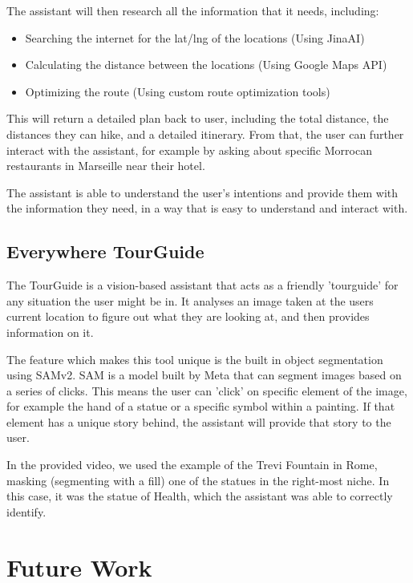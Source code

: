 \documentclass{article}
\begin{document}
The assistant will then research all the information that it needs, including:

\begin{itemize}
\item Searching the internet for the lat/lng of the locations (Using JinaAI)
\item Calculating the distance between the locations (Using Google Maps API)
\item Optimizing the route (Using custom route optimization tools)
\end{itemize}

This will return a detailed plan back to user, including the total distance, the distances they can hike, and a detailed itinerary. From that, the user can further interact with the assistant, for example by asking about specific Morrocan restaurants in Marseille near their hotel.

The assistant is able to understand the user's intentions and provide them with the information they need, in a way that is easy to understand and interact with.

\subsection{Everywhere TourGuide}

The TourGuide is a vision-based assistant that acts as a friendly 'tourguide' for any situation the user might be in. It analyses an image taken at the users current location to figure out what they are looking at, and then provides information on it.

The feature which makes this tool unique is the built in object segmentation using SAMv2. SAM is a model built by Meta that can segment images based on a series of clicks. This means the user can 'click' on specific element of the image, for example the hand of a statue or a specific symbol within a painting. If that element has a unique story behind, the assistant will provide that story to the user.

In the provided video, we used the example of the Trevi Fountain in Rome, masking (segmenting with a fill) one of the statues in the right-most niche. In this case, it was the statue of Health, which the assistant was able to correctly identify.

\section{Future Work}
\end{document}
